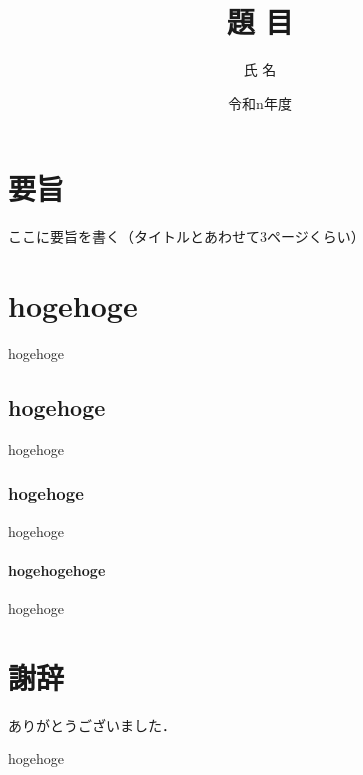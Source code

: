 \documentclass[a4paper, 12pt, uplatex, report]{jsbook}
\begin{document}
  \title{題 目}
  \date{令和n年度}
  \author{氏 名}
  \maketitle{}
  \chapter*{要旨}
  ここに要旨を書く（タイトルとあわせて3ページくらい）


  \frontmatter

  \tableofcontents

  \tableofcontents

  \mainmatter
  \chapter{hogehoge}
  hogehoge

  \section{hogehoge}
  hogehoge

  \subsection{hogehoge}
  hogehoge

  \subsubsection{hogehogehoge}
  hogehoge

  \backmatter
  \chapter{謝辞}
  ありがとうございました．

  \begin{thebibliography}{}
     hogehoge
  \end{thebibliography}
\end{document}
